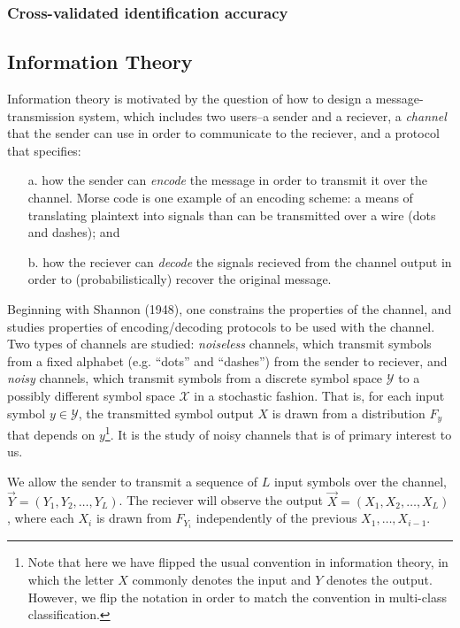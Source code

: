 \subsubsection{Cross-validated identification accuracy}



\subsection{Information Theory}\label{sec:intro_mi}


Information theory is motivated by the question of how to design a
message-transmission system, which includes two users--a sender and a
reciever, a \emph{channel} that the sender can use in order to
communicate to the reciever, and a protocol that specifies:
\begin{itemize}
\item[a.] how the sender can \emph{encode} the message in order to
  transmit it over the channel.  Morse code is one example of an
  encoding scheme: a means of translating plaintext into signals than
  can be transmitted over a wire (dots and dashes); and
\item[b.] how the reciever can \emph{decode} the signals recieved from
  the channel output in order to (probabilistically) recover the
  original message.
\end{itemize}

Beginning with Shannon (1948), one constrains the properties of the
channel, and studies properties of encoding/decoding protocols to be
used with the channel.  Two types of channels are studied:
\emph{noiseless} channels, which transmit symbols from a fixed
alphabet (e.g. ``dots'' and ``dashes'') from the sender to reciever,
and \emph{noisy} channels, which transmit symbols from a discrete
symbol space $\mathcal{Y}$ to a possibly different symbol space
$\mathcal{X}$ in a stochastic fashion.  That is, for each input symbol
$y \in \mathcal{Y}$, the transmitted symbol output $X$ is drawn from a
distribution $F_y$ that depends on $y$\footnote{Note that here we
  have flipped the usual convention in information theory, in which
  the letter $X$ commonly denotes the input and $Y$ denotes the
  output.  However, we flip the notation in order to match the
  convention in multi-class classification.}.  It is the study of
noisy channels that is of primary interest to us.

We allow the sender to transmit a sequence of $L$ input symbols over
the channel, $\vec{Y} = (Y_1,Y_2,\hdots, Y_L)$. The reciever will observe the
output $\vec{X} = (X_1,X_2,\hdots, X_L)$, where each $X_i$ is drawn from
$F_{Y_i}$ independently of the previous $X_1,\hdots, X_{i-1}$.

